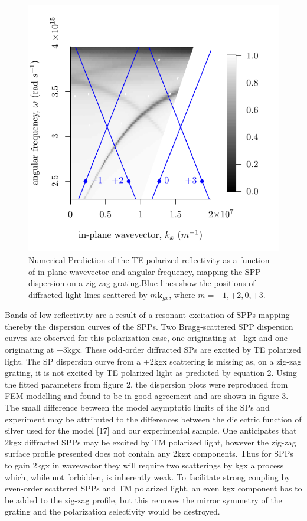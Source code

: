 \documentclass[oneside,11pt,book]{book}
\begin{document}
\begin{figure}
\begin{center}
\includegraphics[scale=1]{figure-TEdispersion-symZZ-HFSS}
\caption{Numerical Prediction of the TE polarized reflectivity as a function of in-plane wavevector and angular frequency, mapping the SPP dispersion on a zig-zag grating.\color{blue}Blue \color{black}lines show the positions of diffracted light lines scattered by $m\mathbf{k}_{gx}$, where $m = −1, +2, 0, +3$.}
\end{center}
\end{figure}
Bands of low reflectivity are a result of a resonant excitation of SPPs mapping thereby the dispersion curves of the SPPs. Two Bragg-scattered SPP dispersion curves are observed for this polarization case, one originating at –kgx and one originating at +3kgx. These odd-order diffracted SPs are excited by TE polarized light. The SP dispersion curve from a +2kgx scattering is missing as, on a zig-zag grating, it is not excited by TE polarized light as predicted by equation 2. Using the fitted parameters from figure 2, the dispersion plots were reproduced from FEM modelling and found to be in good agreement and are shown in figure 3. The small difference between the model asymptotic limits of the SPs and experiment may be attributed to the differences between the dielectric function of silver used for the model [17] and our experimental sample. One anticipates that 2kgx diffracted SPPs may be excited by TM polarized light, however the zig-zag surface profile presented does not contain any 2kgx components. Thus for SPPs to gain 2kgx in wavevector they will require two scatterings by kgx a process which, while not forbidden, is inherently weak. To facilitate strong coupling by even-order scattered SPPs and TM polarized light, an even kgx component has to be added to the zig-zag profile, but this removes the mirror symmetry of the grating and the polarization selectivity would be destroyed.
\end{document}
